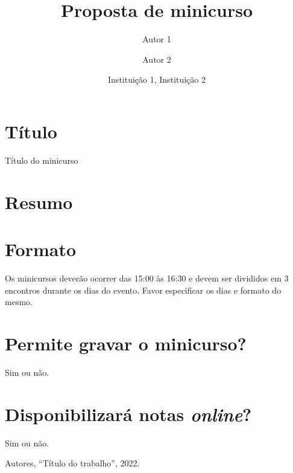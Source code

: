 \documentclass[12pt]{article}
\title{Proposta de minicurso}
\author{Autor 1 \and Autor 2}
\date{Instituição 1, Instituição 2}
\begin{document}
\maketitle

\section{Título}

Título do minicurso

\section{Resumo}

\lipsum[1]

\section{Formato}

Os minicursos deverão ocorrer das 15:00 às 16:30 e devem ser divididos
em 3 encontros durante os dias do evento. Favor especificar os dias e
formato do mesmo.

\section{Permite gravar o minicurso?}

Sim ou não.

\section{Disponibilizará notas \emph{online}?}

Sim ou não.

\begin{thebibliography}{XXXXXX}

 Autores, ``Título do trabalho'', 2022.

\end{thebibliography}
\end{document}
